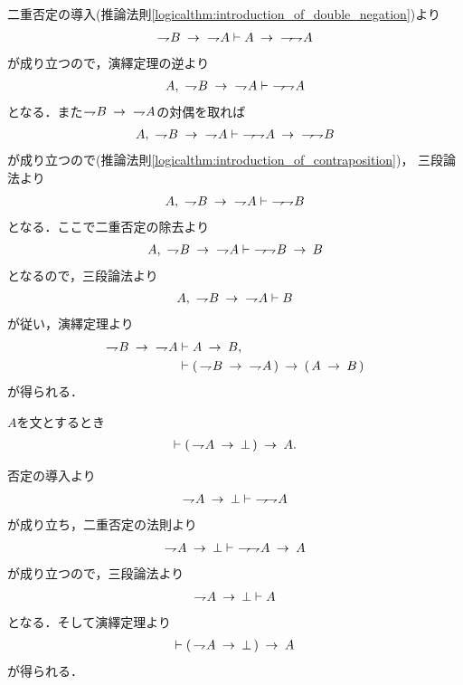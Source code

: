 	\begin{prf}
		二重否定の導入(推論法則\ref{logicalthm:introduction_of_double_negation})より
		\begin{align}
			\negation B \rarrow\ \negation A \vdash 
			A \rarrow\ \negation \negation A
		\end{align}
		が成り立つので，演繹定理の逆より
		\begin{align}
			A,\ \negation B \rarrow\ \negation A \vdash\ \negation \negation A
		\end{align}
		となる．また$\negation B \rarrow\ \negation A$の対偶を取れば
		\begin{align}
			A,\ \negation B \rarrow\ \negation A \vdash\ 
			\negation \negation A \rarrow\ \negation \negation B
		\end{align}
		が成り立つので(推論法則\ref{logicalthm:introduction_of_contraposition})，
		三段論法より
		\begin{align}
			A,\ \negation B \rarrow\ \negation A \vdash\ \negation \negation B
		\end{align}
		となる．ここで二重否定の除去より
		\begin{align}
			A,\ \negation B \rarrow\ \negation A \vdash\ 
			\negation \negation B \rarrow B
		\end{align}
		となるので，三段論法より
		\begin{align}
			A,\ \negation B \rarrow\ \negation A \vdash B
		\end{align}
		が従い，演繹定理より
		\begin{align}
			\negation B \rarrow\ \negation A &\vdash A \rarrow B, \\
			&\vdash (\, \negation B \rarrow\ \negation A\, ) 
			\rarrow (\, A \rarrow B\, )
		\end{align}
		が得られる．
		\QED
	\end{prf}
	
	\begin{screen}
		\begin{logicalthm}[背理法の原理]
		\label{logicalthm:proof_by_contradiction}
			$A$を文とするとき
			\begin{align}
				\vdash (\, \negation A \rarrow \bot\, ) \rarrow A.
			\end{align}
		\end{logicalthm}
	\end{screen}
	
	\begin{prf}
		否定の導入より
		\begin{align}
			\negation A \rarrow \bot \vdash\ \negation \negation A
		\end{align}
		が成り立ち，二重否定の法則より
		\begin{align}
			\negation A \rarrow \bot \vdash\ \negation \negation A \rarrow A
		\end{align}
		が成り立つので，三段論法より
		\begin{align}
			\negation A \rarrow \bot \vdash A
		\end{align}
		となる．そして演繹定理より
		\begin{align}
			\vdash (\, \negation A \rarrow \bot\, ) \rarrow A
		\end{align}
		が得られる．
		\QED
	\end{prf}
	
